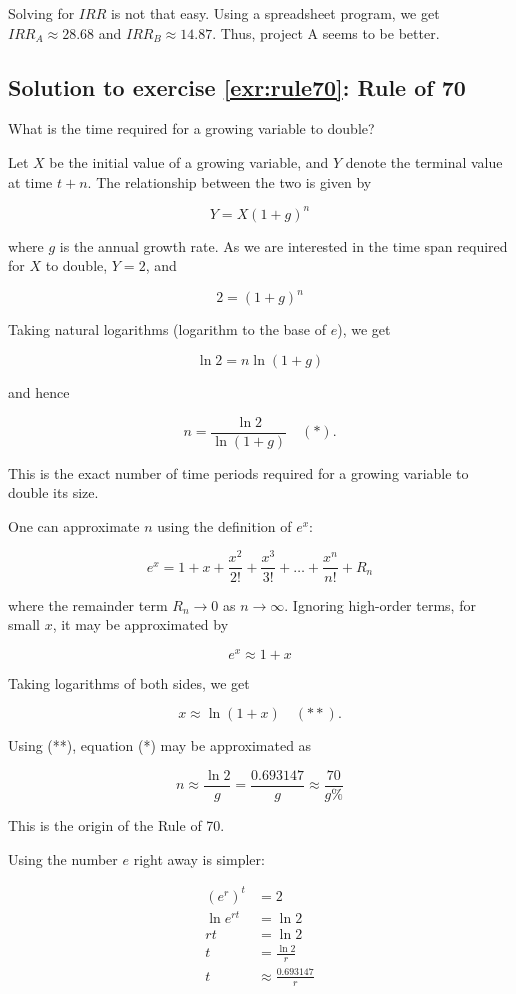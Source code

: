 \documentclass[
  12pt,
  oneside]{book}
\theoremstyle{definition}
\theoremstyle{definition}
\theoremstyle{definition}
\theoremstyle{definition}
\theoremstyle{remark}
\begin{document}
Solving for \(IRR\) is not that easy. Using a spreadsheet program, we get \(IRR_A\approx 28.68%
\) and \(IRR_B\approx 14.87%
\). Thus, project A seems to be better.

\subsection*{Solution to exercise \ref{exr:rule70}: Rule of 70}\label{sol:rule70}

What is the time required for a growing variable to double?

Let \(X\) be the initial value of a growing variable, and \(Y\) denote the terminal value at time \(t + n\). The relationship between the two is given by

\[Y = X(1+g)^n\]

where \(g\) is the annual growth rate. As we are interested in the time span required for \(X\) to double, \(Y = 2\), and

\[2 = (1+g)^n\]

Taking natural logarithms (logarithm to the base of \(e\)), we get

\[\ln 2 = n \ln (1+g)\]

and hence

\[n = \frac{\ln 2}{\ln (1+g)} \quad (*).\]

This is the exact number of time periods required for a growing variable to double its size.

One can approximate \(n\) using the definition of \(e^x\):

\[e^x = 1 + x + \frac{x^2}{2!} + \frac{x^3}{3!} + \ldots + \frac{x^n}{n!} + R_n\]

where the remainder term \(R_n \rightarrow 0\) as \(n \rightarrow \infty\). Ignoring high-order terms, for small \(x\), it may be approximated by

\[e^x \approx 1 + x\]

Taking logarithms of both sides, we get

\[x \approx \ln (1 + x) \quad (**).\]

Using (**), equation (*) may be approximated as

\[n \approx \frac{\ln 2}{g} = \frac{0.693147}{g} \approx \frac{70}{g\%}\]

This is the origin of the Rule of 70.

Using the number \(e\) right away is simpler:

\begin{align*}
(e^r)^t &= 2 \\
\ln e^{rt} &= \ln 2 \\
rt &= \ln 2 \\
t &= \frac{\ln 2}{r} \\
t &\approx \frac{0.693147}{r}
\end{align*}
\end{document}
